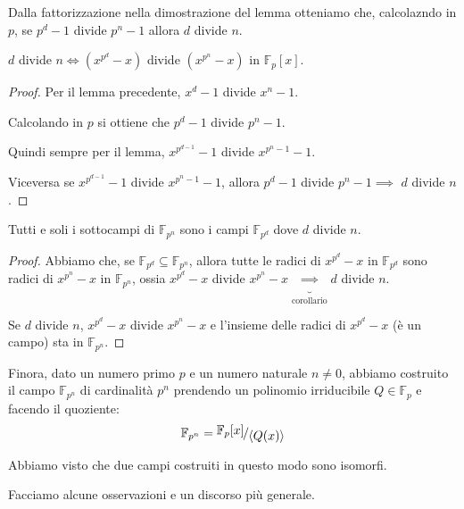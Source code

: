 \documentclass[../main.tex]{subfiles}
\begin{document}
Dalla fattorizzazione nella dimostrazione del lemma otteniamo che, calcolazndo in $p$, se $p^d - 1$ divide $p^n - 1$ allora $d$ divide $n$.

\begin{corollary}
    $d$ divide $n \iff (x^{p^d} - x)$ divide $(x^{p^n} - x)$ in $\mathbb{F}_p[x]$.
\end{corollary}
\begin{proof}
    Per il lemma precedente, $x^d - 1$ divide $x^n - 1$.

    Calcolando in $p$ si ottiene che $p^d - 1$ divide $p^n - 1$.

    Quindi sempre per il lemma, $x^{p^{d - 1}} - 1$ divide $x^{p^n - 1} - 1$.

    Viceversa se $x^{p^{d - 1}} - 1$ divide $x^{p^n -1 } - 1$, allora $p^d - 1$ divide $p^n - 1 \implies$ $d$ divide $n$.
\end{proof}

\begin{proposition}
    Tutti e soli i sottocampi di $\mathbb{F}_{p^n}$ sono i campi $\mathbb{F}_{p^d}$ dove $d$ divide $n$.
\end{proposition}

\begin{proof}
    Abbiamo che, se $\mathbb{F}_{p^d} \subseteq \mathbb{F}_{p^n}$, allora tutte le radici di $x^{p^d} - x$ in $\mathbb{F}_{p^d}$ sono radici di $x^{p^n} - x$ in $\mathbb{F}_{p^n}$, ossia $x^{p^d} - x$ divide $x^{p^n} - x \underbrace{\implies}_{\text{corollario}} d$ divide $n$.

    Se $d$ divide $n$, $x^{p^d} - x $ divide $x^{p^n} - x$ e l'insieme delle radici di $x^{p^d} - x$ (è un campo) sta in $\mathbb{F}_{p^n}$.
\end{proof}

Finora, dato un numero primo $p$ e un numero naturale $n \neq 0$, abbiamo costruito il campo $\mathbb{F}_{p^n}$ di cardinalità $p^n$ prendendo un polinomio irriducibile $Q \in \mathbb{F}_p$ e facendo il quoziente:
\begin{equation*}
    \mathbb{F}_{p^n} = \nicefrac{\mathbb{F}_p[x]}{\langle Q(x)\rangle}
\end{equation*}

Abbiamo visto che due campi costruiti in questo modo sono isomorfi.

Facciamo alcune osservazioni e un discorso più generale.
\end{document}
